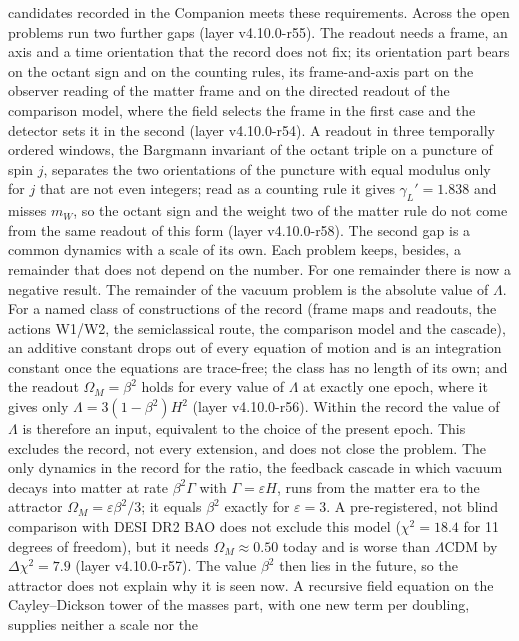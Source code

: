 candidates recorded in the Companion meets these requirements.
Across the open problems run two further gaps (layer v4.10.0-r55). The
readout needs a frame, an axis and a time orientation that the record
does not fix; its orientation part bears on the octant sign and on the
counting rules, its frame-and-axis part on the observer reading of the
matter frame and on the directed readout of the comparison model, where
the field selects the frame in the first case and the detector sets it
in the second (layer v4.10.0-r54). A readout in three temporally
ordered windows, the Bargmann invariant of the octant triple on a
puncture of spin $j$, separates the two orientations of the puncture
with equal modulus only for $j$ that are not even integers; read as a
counting rule it gives $\gamma_L'=1.838$ and misses $m_W$, so the octant
sign and the weight two of the matter rule do not come from the same
readout of this form (layer v4.10.0-r58). The second gap is a common dynamics
with a scale of its own. Each problem keeps, besides, a remainder that
does not depend on the number.
For one remainder there is now a negative result. The remainder of the
vacuum problem is the absolute value of $\Lambda$. For a named class of
constructions of the record (frame maps and readouts, the actions W1/W2,
the semiclassical route, the comparison model and the cascade), an
additive constant drops out of every equation of motion and is an
integration constant once the equations are trace-free; the class has
no length of its own; and the readout $\Omega_M=\beta^2$ holds for every
value of $\Lambda$ at exactly one epoch, where it gives only
$\Lambda=3(1-\beta^2)H^2$ (layer v4.10.0-r56). Within the record the
value of $\Lambda$ is therefore an input, equivalent to the choice of the
present epoch. This excludes the record, not every extension, and does
not close the problem.
The only dynamics in the record for the ratio, the feedback cascade in
which vacuum decays into matter at rate $\beta^2\Gamma$ with $\Gamma=\varepsilon H$,
runs from the matter era to the attractor $\Omega_M=\varepsilon\beta^2/3$; it equals
$\beta^2$ exactly for $\varepsilon=3$. A pre-registered, not blind comparison
with DESI DR2 BAO does not exclude this model ($\chi^2=18.4$ for 11
degrees of freedom), but it needs $\Omega_M\approx0.50$ today and is worse than
$\Lambda$CDM by $\Delta\chi^2=7.9$ (layer v4.10.0-r57). The value $\beta^2$ then lies in
the future, so the attractor does not explain why it is seen now.
A recursive field equation on the Cayley--Dickson tower of the masses
part, with one new term per doubling, supplies neither a scale nor the
